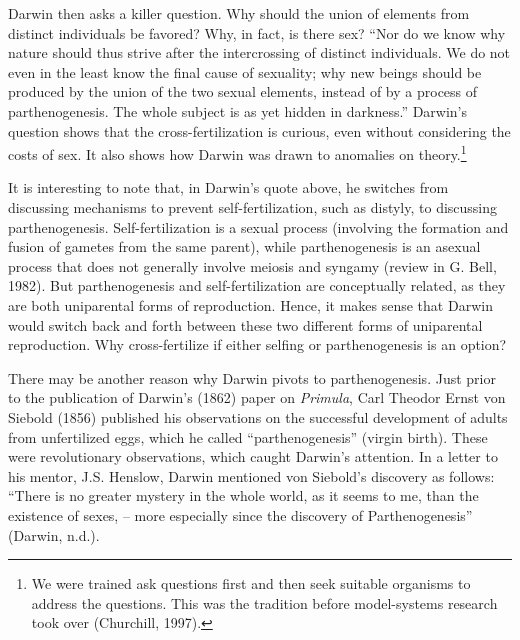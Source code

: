 \documentclass[
  letterpaper,
]{book}
\begin{document}
Darwin then asks a killer question. Why should the union of elements
from distinct individuals be favored? Why, in fact, is there sex? ``Nor
do we know why nature should thus strive after the intercrossing of
distinct individuals. We do not even in the least know the final cause
of sexuality; why new beings should be produced by the union of the two
sexual elements, instead of by a process of parthenogenesis. The whole
subject is as yet hidden in darkness.'' Darwin's question shows that the
cross-fertilization is curious, even without considering the costs of
sex. It also shows how Darwin was drawn to anomalies on
theory.\footnote{We were trained ask questions first and then seek
  suitable organisms to address the questions. This was the tradition
  before model-systems research took over (Churchill, 1997).}

It is interesting to note that, in Darwin's quote above, he switches
from discussing mechanisms to prevent self-fertilization, such as
distyly, to discussing parthenogenesis. Self-fertilization is a sexual
process (involving the formation and fusion of gametes from the same
parent), while parthenogenesis is an asexual process that does not
generally involve meiosis and syngamy (review in G. Bell, 1982). But
parthenogenesis and self-fertilization are conceptually related, as they
are both uniparental forms of reproduction. Hence, it makes sense that
Darwin would switch back and forth between these two different forms of
uniparental reproduction. Why cross-fertilize if either selfing or
parthenogenesis is an option?

There may be another reason why Darwin pivots to parthenogenesis. Just
prior to the publication of Darwin's (1862) paper on \emph{Primula},
Carl Theodor Ernst von Siebold (1856) published his observations on the
successful development of adults from unfertilized eggs, which he called
``parthenogenesis'' (virgin birth). These were revolutionary
observations, which caught Darwin's attention. In a letter to his
mentor, J.S. Henslow, Darwin mentioned von Siebold's discovery as
follows: ``There is no greater mystery in the whole world, as it seems
to me, than the existence of sexes, -- more especially since the
discovery of Parthenogenesis'' (Darwin, n.d.).
\end{document}
